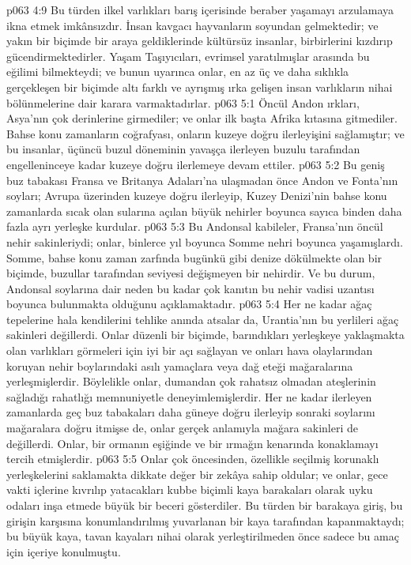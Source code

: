 \vs p063 4:9 Bu türden ilkel varlıkları barış içerisinde beraber yaşamayı arzulamaya ikna etmek imkânsızdır. İnsan kavgacı hayvanların soyundan gelmektedir; ve yakın bir biçimde bir araya geldiklerinde kültürsüz insanlar, birbirlerini kızdırıp gücendirmektedirler. Yaşam Taşıyıcıları, evrimsel yaratılmışlar arasında bu eğilimi bilmekteydi; ve bunun uyarınca onlar, en az üç ve daha sıklıkla gerçekleşen bir biçimde altı farklı ve ayrışmış ırka gelişen insan varlıkların nihai bölünmelerine dair karara varmaktadırlar.
\vs p063 5:1 Öncül Andon ırkları, Asya’nın çok derinlerine girmediler; ve onlar ilk başta Afrika kıtasına gitmediler. Bahse konu zamanların coğrafyası, onların kuzeye doğru ilerleyişini sağlamıştır; ve bu insanlar, üçüncü buzul döneminin yavaşça ilerleyen buzulu tarafından engelleninceye kadar kuzeye doğru ilerlemeye devam ettiler.
\vs p063 5:2 Bu geniş buz tabakası Fransa ve Britanya Adaları’na ulaşmadan önce Andon ve Fonta’nın soyları; Avrupa üzerinden kuzeye doğru ilerleyip, Kuzey Denizi’nin bahse konu zamanlarda sıcak olan sularına açılan büyük nehirler boyunca sayıca binden daha fazla ayrı yerleşke kurdular.
\vs p063 5:3 Bu Andonsal kabileler, Fransa’nın öncül nehir sakinleriydi; onlar, binlerce yıl boyunca Somme nehri boyunca yaşamışlardı. Somme, bahse konu zaman zarfında bugünkü gibi denize dökülmekte olan bir biçimde, buzullar tarafından seviyesi değişmeyen bir nehirdir. Ve bu durum, Andonsal soylarına dair neden bu kadar çok kanıtın bu nehir vadisi uzantısı boyunca bulunmakta olduğunu açıklamaktadır.
\vs p063 5:4 Her ne kadar ağaç tepelerine hala kendilerini tehlike anında atsalar da, Urantia’nın bu yerlileri ağaç sakinleri değillerdi. Onlar düzenli bir biçimde, barındıkları yerleşkeye yaklaşmakta olan varlıkları görmeleri için iyi bir açı sağlayan ve onları hava olaylarından koruyan nehir boylarındaki asılı yamaçlara veya dağ eteği mağaralarına yerleşmişlerdir. Böylelikle onlar, dumandan çok rahatsız olmadan ateşlerinin sağladığı rahatlığı memnuniyetle deneyimlemişlerdir. Her ne kadar ilerleyen zamanlarda geç buz tabakaları daha güneye doğru ilerleyip sonraki soylarını mağaralara doğru itmişse de, onlar gerçek anlamıyla mağara sakinleri de değillerdi. Onlar, bir ormanın eşiğinde ve bir ırmağın kenarında konaklamayı tercih etmişlerdir.
\vs p063 5:5 Onlar çok öncesinden, özellikle seçilmiş korunaklı yerleşkelerini saklamakta dikkate değer bir zekâya sahip oldular; ve onlar, gece vakti içlerine kıvrılıp yatacakları kubbe biçimli kaya barakaları olarak uyku odaları inşa etmede büyük bir beceri gösterdiler. Bu türden bir barakaya giriş, bu girişin karşısına konumlandırılmış yuvarlanan bir kaya tarafından kapanmaktaydı; bu büyük kaya, tavan kayaları nihai olarak yerleştirilmeden önce sadece bu amaç için içeriye konulmuştu.
